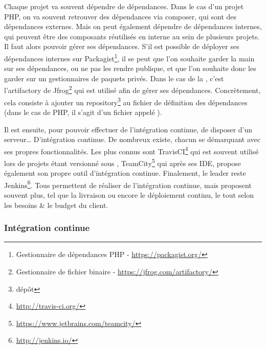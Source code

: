 Chaque projet va souvent dépendre de dépendances. Dans le cas d'un projet \gls{PHP}, on va souvent retrouver des dépendances via composer, qui sont des dépendances externes. Mais on peut également dépendre de dépendances internes, qui peuvent être des composants réutilisés en interne au sein de plusieurs projets. Il faut alors pouvoir gérer ses dépendances. S'il est possible de déployer ses dépendances internes sur Packagist\footnote{Gestionnaire de dépendances \gls{PHP} - \url{https://packagist.org/}}, il se peut que l'on souhaite garder la main sur ses dépendances, ou ne pas les rendre publique, et que l'on souhaite donc les garder sur un gestionnaires de paquets privés. Dans le cas de la \naq, c'est l'\gls{artifactory} de Jfrog\footnote{Gestionnaire de fichier binaire - \url{https://jfrog.com/artifactory/}} qui est utilisé afin de gérer ses dépendances. Concrètement, cela consiste à ajouter un repository\footnote{dépôt} au fichier de définition des dépendances (dans le cas de \gls{PHP}, il s'agit d'un fichier appelé ).


Il est ensuite, pour pouvoir effectuer de l'intégration continue, de disposer d'un serveur\ldots{} D'intégration continue. De nombreux existe, chacun se démarquant avec ses propres fonctionnalités. Les plus connus sont TravisCI\footnote{\url{http://travis-ci.org/}} qui est souvent utilisé lors de projets étant versionné sous \github, TeamCity\footnote{\url{https://www.jetbrains.com/teamcity/}} qui après ses \gls{IDE}, propose également son propre outil d'intégration continue. Finalement, le leader reste Jenkins\footnote{\url{http://jenkins.io/}}. Tous permettent de réaliser de l'intégration continue, mais proposent souvent plus, tel que la livraison ou encore le déploiement continu, le tout selon les besoins \& le budget du client.

\subsubsection{Intégration continue}

